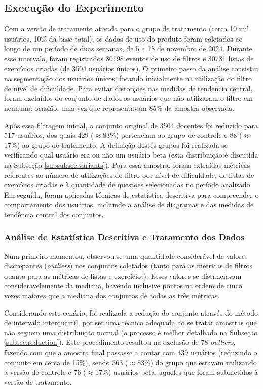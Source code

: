\subsection{Execução do Experimento}
\label{subsec:experimento}

Com a versão de tratamento ativada para o grupo de tratamento (cerca 10 mil usuários, 10\% da base total), os dados de uso do produto foram coletados ao longo de um período de duas semanas, de 5 a 18 de novembro de 2024. Durante esse intervalo, foram registrados 80198 eventos de uso de filtros e 30731 listas de exercícios criadas (de 3504 usuários únicos). O primeiro passo da análise consistiu na segmentação dos usuários únicos, focando inicialmente na utilização do filtro de nível de dificuldade. Para evitar distorções nas medidas de tendência central, foram excluídos do conjunto de dados os usuários que não utilizaram o filtro em nenhuma ocasião, uma vez que representavam 85\% da amostra observada.

Após essa filtragem inicial, o conjunto original de 3504 docentes foi reduzido para 517 usuários, dos quais 429 ($\approx $83\%) pertenciam ao grupo de controle e 88 ($\approx $17\%) ao grupo de tratamento. A definição destes grupos foi realizada se verificando qual usuário era ou não um usuário beta (esta distribuição é discutida na Subseção \ref{subsubsec:variants}). Para essa amostra, foram extraídas métricas referentes ao número de utilizações do filtro por nível de dificuldade, de listas de exercícios criadas e à quantidade de questões selecionadas no período analisado. Em seguida, foram aplicadas técnicas de estatística descritiva para compreender o comportamento dos usuários, incluindo a análise de diagramas e das medidas de tendência central dos conjuntos.

\subsubsection{Análise de Estatística Descritiva e Tratamento dos Dados}

Num primeiro momentou, observou-se uma quantidade considerável de valores discrepantes (\textit{outliers}) nos conjuntos coletados (tanto para as métricas de filtros quanto para as métricas de listas e exercícios). Esses valores se distanciavam consideravelemente da mediana, havendo inclusive pontos na ordem de cinco vezes maiores que a mediana dos conjuntos de todas as três métricas.

Considerando este cenário, foi realizada a redução do conjunto através do método de intervalo interquartil, por ser uma técnica adequada ao se tratar amostras que não seguem uma distribuição normal (o processo é melhor detalhado na Subseção \ref{subsec:reduction}). Este procedimento resultou na exclusão de 78 \textit{outliers}, fazendo com que a amostra final passasse a contar com 439 usuários (reduzindo o conjunto em cerca de 15\%), sendo 363 ($\approx $83\%) do grupo que estavam utilizando a versão de controle e 76 ($\approx $17\%) usuários beta, aqueles que foram submetidos à versão de tratamento.

